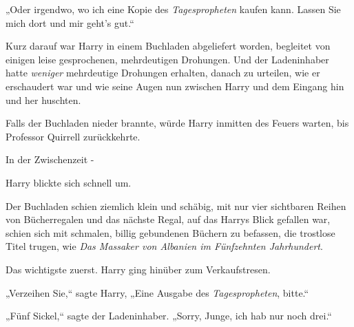 „Oder irgendwo, wo ich eine Kopie des \emph{Tagespropheten} kaufen kann. Lassen Sie mich dort und mir geht's gut.“

Kurz darauf war Harry in einem Buchladen abgeliefert worden, begleitet von einigen leise gesprochenen, mehrdeutigen Drohungen. Und der Ladeninhaber hatte \emph{weniger} mehrdeutige Drohungen erhalten, danach zu urteilen, wie er erschaudert war und wie seine Augen nun zwischen Harry und dem Eingang hin und her huschten.

Falls der Buchladen nieder brannte, würde Harry inmitten des Feuers warten, bis Professor Quirrell zurückkehrte.

In der Zwischenzeit -

Harry blickte sich schnell um.

Der Buchladen schien ziemlich klein und schäbig, mit nur vier sichtbaren Reihen von Bücherregalen und das nächste Regal, auf das Harrys Blick gefallen war, schien sich mit schmalen, billig gebundenen Büchern zu befassen, die trostlose Titel trugen, wie \emph{Das Massaker von Albanien im Fünfzehnten Jahrhundert}.%

Das wichtigste zuerst. Harry ging hinüber zum Verkaufstresen.

„Verzeihen Sie,“ sagte Harry, „Eine Ausgabe des \emph{Tagespropheten}, bitte.“

„Fünf Sickel,“ sagte der Ladeninhaber. „Sorry, Junge, ich hab nur noch drei.“

